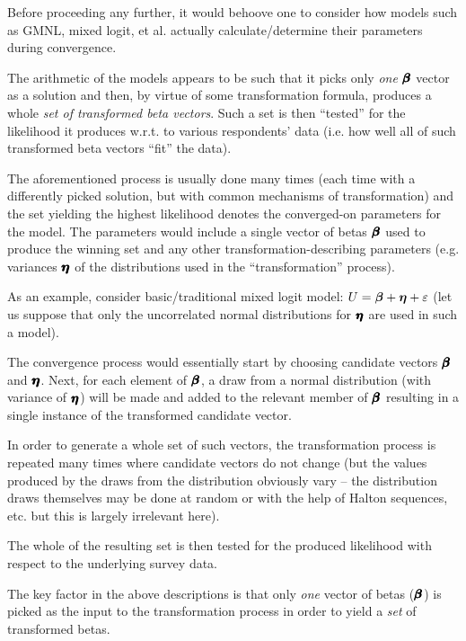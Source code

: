 \documentclass[12pt,a4paper]{article}
\begin{document}
\newpage
Before proceeding any further, it would behoove one to consider how models such as GMNL, mixed logit, et al. actually calculate/determine their parameters during convergence.

The arithmetic of the models appears to be such that it picks only \textit{one} \(\pmb{\hm{\beta}}\) vector as a solution and then, by virtue of some transformation formula, produces a whole \textit{set of transformed beta vectors}. Such a set is then ``tested'' for the likelihood it produces w.r.t. to various respondents' data (i.e. how well all of such transformed beta vectors ``fit'' the data). 

The aforementioned process is usually done many times (each time with a differently picked solution, but with common mechanisms of transformation) and the set yielding the highest likelihood denotes the converged-on parameters for the model. The parameters would include a single vector of betas \(\pmb{\hm{\beta}}\) used to produce the winning set and any other transformation-describing parameters (e.g. variances \(\pmb{\hm{\eta}}\) of the distributions used in the ``transformation'' process).

As an example, consider basic/traditional mixed logit model: \(U=\hm{\beta}+\hm{\eta} + \varepsilon\) (let us suppose that only the uncorrelated normal distributions for \(\pmb{\hm{\eta}}\)  are used in such a model).

The convergence process would essentially start by choosing candidate vectors \(\pmb{\hm{\beta}}\) and \(\pmb{\hm{\eta}}\). Next, for each element of \(\pmb{\hm{\beta}}\), a draw from a normal distribution (with variance of \(\pmb{\hm{\eta}}\)) will be made and added to the relevant member of \(\pmb{\hm{\beta}}\) resulting in a single instance of the transformed candidate vector. 

In order to generate a whole set of such vectors, the transformation process is repeated many times where candidate vectors do not change (but the values produced by the draws from the distribution obviously vary -- the distribution draws themselves may be done at random or with the help of Halton sequences, etc. but this is largely irrelevant here).

The whole of the resulting set is then tested for the produced likelihood with respect to the underlying survey data.

The key factor in the above descriptions is that only \textit{one} vector of betas (\(\pmb{\hm{\beta}}\)) is picked as the input to the transformation process in order to yield a \textit{set} of transformed betas.
\end{document}
